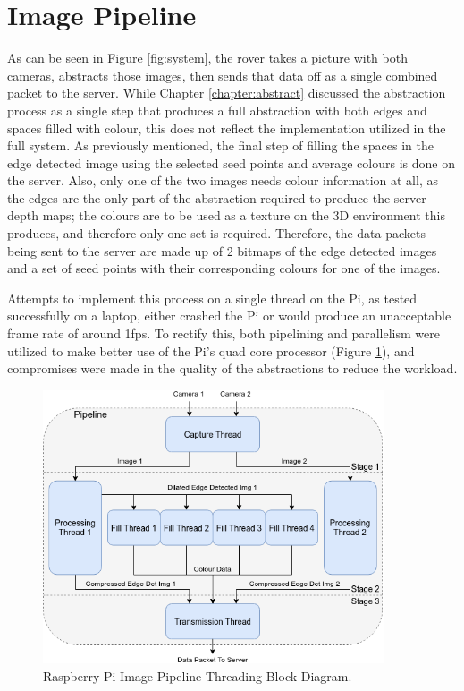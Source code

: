 \section{Image Pipeline}
\label{Subsection:comms}

As can be seen in Figure \ref{fig:system}, the rover takes a picture with both cameras, abstracts those images, then sends that data off as a single combined packet to the server. While Chapter \ref{chapter:abstract} discussed the abstraction process as a single step that produces a full abstraction with both edges and spaces filled with colour, this does not reflect the implementation utilized in the full system. As previously mentioned, the final step of filling the spaces in the edge detected image using the selected seed points and average colours is done on the server. Also, only one of the two images needs colour information at all, as the edges are the only part of the abstraction required to produce the server depth maps; the colours are to be used as a texture on the 3D environment this produces, and therefore only one set is required. Therefore, the data packets being sent to the server are made up of 2 bitmaps of the edge detected images and a set of seed points with their corresponding colours for one of the images.

Attempts to implement this process on a single thread on the Pi, as tested successfully on a laptop, either crashed the Pi or would produce an unacceptable frame rate of around 1fps. To rectify this, both pipelining and parallelism were utilized to make better use of the Pi's quad core processor (Figure \ref{fig:threads}), and compromises were made in the quality of the abstractions to reduce the workload.

\begin{figure}[H]
    \begin{center}
      \includegraphics[width=0.9\textwidth]{Figures/Threads.png}
      \caption[Raspberry Pi Image Pipeline Threading Block Diagram]{Raspberry Pi Image Pipeline Threading Block Diagram.}
      \label{fig:threads}
    \end{center}
\end{figure}

